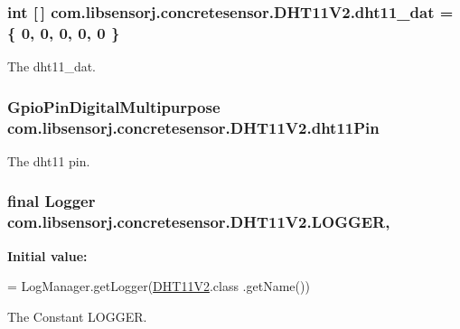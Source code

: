 \subsubsection[{dht11\+\_\+dat}]{\setlength{\rightskip}{0pt plus 5cm}int \mbox{[}$\,$\mbox{]} com.\+libsensorj.\+concretesensor.\+D\+H\+T11\+V2.\+dht11\+\_\+dat = \{ 0, 0, 0, 0, 0 \}\hspace{0.3cm}{\ttfamily [private]}}\label{classcom_1_1libsensorj_1_1concretesensor_1_1DHT11V2_ae61a33360dfe4106613bf970ecb6d96c}
The dht11\+\_\+dat. \hypertarget{classcom_1_1libsensorj_1_1concretesensor_1_1DHT11V2_a04cca3ab141bcf0089fd6a7338a5dabe}{}
\subsubsection[{dht11\+Pin}]{\setlength{\rightskip}{0pt plus 5cm}Gpio\+Pin\+Digital\+Multipurpose com.\+libsensorj.\+concretesensor.\+D\+H\+T11\+V2.\+dht11\+Pin\hspace{0.3cm}{\ttfamily [private]}}\label{classcom_1_1libsensorj_1_1concretesensor_1_1DHT11V2_a04cca3ab141bcf0089fd6a7338a5dabe}
The dht11 pin. \hypertarget{classcom_1_1libsensorj_1_1concretesensor_1_1DHT11V2_acef19b315279adf9b39a4407487d401e}{}
\subsubsection[{L\+O\+G\+G\+E\+R}]{\setlength{\rightskip}{0pt plus 5cm}final Logger com.\+libsensorj.\+concretesensor.\+D\+H\+T11\+V2.\+L\+O\+G\+G\+E\+R\hspace{0.3cm}{\ttfamily [static]}, {\ttfamily [private]}}\label{classcom_1_1libsensorj_1_1concretesensor_1_1DHT11V2_acef19b315279adf9b39a4407487d401e}
{\bfseries Initial value\+:}
\begin{DoxyCode}
= LogManager.getLogger(\hyperlink{classcom_1_1libsensorj_1_1concretesensor_1_1DHT11V2_a19e1a415c048669c7b4879e02d852682}{DHT11V2}.class
            .getName())
\end{DoxyCode}
The Constant L\+O\+G\+G\+E\+R. \hypertarget{classcom_1_1libsensorj_1_1concretesensor_1_1DHT11V2_ad64749b474c180fea185aecd512eb656}{}
